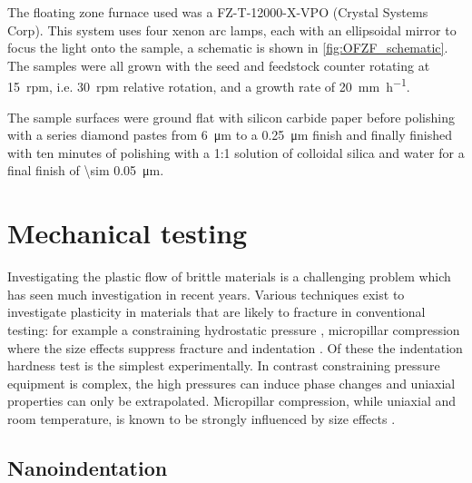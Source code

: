 The floating zone furnace used was a FZ-T-12000-X-VPO (Crystal Systems Corp). This system uses four xenon arc lamps, each with an ellipsoidal mirror to focus the light onto the sample, a schematic is shown in \autoref{fig:OFZF_schematic}. The samples were all grown with the seed and feedstock counter rotating at \num{15}~rpm, i.e. \num{30}~rpm relative rotation, and a growth rate of \SI{20}{\milli\meter\per\hour}.


The sample surfaces were ground flat with silicon carbide paper before polishing with a series diamond pastes from \SI{6}{\micro\meter}  to a \SI{0.25}{\micro\meter} finish and finally finished with ten minutes of polishing with a 1:1 solution of colloidal silica and water for a final finish of \SI{\sim 0.05}{\micro\meter}.

















\section{Mechanical testing}
\label{sec:Ti2Ni_mechtesting}

Investigating the plastic flow of brittle materials is a challenging problem which has seen much investigation in recent years. Various techniques exist to investigate plasticity in materials that are likely to fracture in conventional testing: for example a constraining hydrostatic pressure \cite{Griggs1936,Weinrich1975,Borvin1990}, micropillar compression where the size effects suppress fracture \cite{Uchic2004} and indentation \cite{Cripps2011,tabor2000hardness,Marsh1964,Korte2009}. Of these the indentation hardness test is the simplest experimentally. In contrast constraining pressure equipment is complex, the high pressures can induce phase changes and uniaxial properties can only be extrapolated. Micropillar compression, while uniaxial and room temperature, is known to be strongly influenced by size effects \cite{Uchic2004,Greer2005,Greer2006corrigendum}.


\subsection{Nanoindentation}

